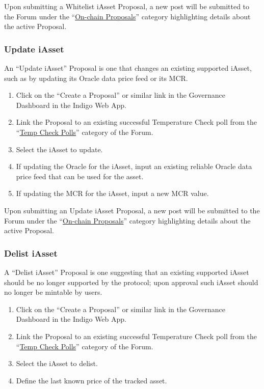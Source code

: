 Upon submitting a Whitelist iAsset Proposal, a new post will be
submitted to the Forum under the
``\href{https://forum.indigoprotocol.io/c/proposals/6}{On-chain
Proposals}'' category highlighting details about the active Proposal.

\hypertarget{update-iasset}{%
\subsubsection{Update iAsset}\label{update-iasset}}

An ``Update iAsset'' Proposal is one that changes an existing supported
iAsset, such as by updating its Oracle data price feed or its MCR.

\begin{enumerate}
\item
  Click on the ``Create a Proposal'' or similar link in the Governance
  Dashboard in the Indigo Web App.
\item
  Link the Proposal to an existing successful Temperature Check poll
  from the ``\href{https://forum.indigoprotocol.io/c/polls/11}{Temp
  Check Polls}'' category of the Forum.
\item
  Select the iAsset to update.
\item
  If updating the Oracle for the iAsset, input an existing reliable
  Oracle data price feed that can be used for the asset.
\item
  If updating the MCR for the iAsset, input a new MCR value.
\end{enumerate}

Upon submitting an Update iAsset Proposal, a new post will be submitted
to the Forum under the
``\href{https://forum.indigoprotocol.io/c/proposals/6}{On-chain
Proposals}'' category highlighting details about the active Proposal.

\hypertarget{delist-iasset}{%
\subsubsection{Delist iAsset}\label{delist-iasset}}

A ``Delist iAsset'' Proposal is one suggesting that an existing
supported iAsset should be no longer supported by the protocol; upon
approval such iAsset should no longer be mintable by users.

\begin{enumerate}
\item
  Click on the ``Create a Proposal'' or similar link in the Governance
  Dashboard in the Indigo Web App.
\item
  Link the Proposal to an existing successful Temperature Check poll
  from the ``\href{https://forum.indigoprotocol.io/c/polls/11}{Temp
  Check Polls}'' category of the Forum.
\item
  Select the iAsset to delist.
\item
  Define the last known price of the tracked asset.
\end{enumerate}


